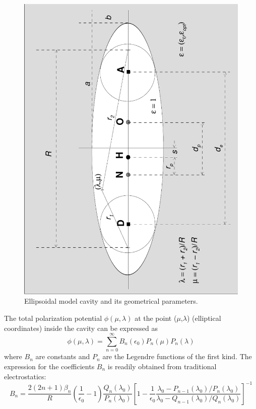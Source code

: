 \documentclass[oneside,11pt,openany]{book}
\begin{document}
\begin{figure}[!bbb]
\begin{center}
\includegraphics[scale=0.65,angle=-90]{ellips.pdf}
\end{center}
\caption{Ellipsoidal model cavity and its geometrical parameters.}
\label{fig1}
\end{figure}
\par
The total polarization potential $\phi(\mu,\lambda)$ at the point ($\mu$,$\lambda$) (elliptical coordinates) inside the cavity
can be expressed as\cite{Kirkwood38}
\begin{equation}
\phi(\mu,\lambda)=\sum_{n=0}^{\infty}B_n(\epsilon_0)P_n(\mu)P_n(\lambda)
\label{phi_tot}
\end{equation}
where $B_n$ are constants and $P_n$ are the Legendre functions
of the first kind. The expression for the coefficients $B_n$
is readily obtained from traditional electrostatics:
\begin{equation}
B_n=\frac{2(2n+1)\beta_n}{R}\left(\frac{1}{\epsilon_0}-1\right)
\frac{Q_n(\lambda_0)}{P_n(\lambda_0)}
\left[1-\frac{1}{\epsilon_0}
\frac{\lambda_0-P_{n-1}(\lambda_0)/P_n(\lambda_0)}
     {\lambda_0-Q_{n-1}(\lambda_0)/Q_n(\lambda_0)}
\right]^{-1}
\label{bcoef}
\end{equation}
\end{document}
